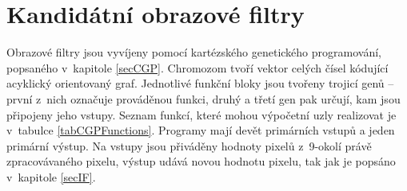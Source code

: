 \section{Kandidátní obrazové filtry}
\label{secDesignIF}

Obrazové filtry jsou vyvíjeny pomocí kartézského genetického programování, popsaného v~kapitole \ref{secCGP}. Chromozom tvoří vektor celých čísel kódující acyklický orientovaný graf. Jednotlivé funkční bloky jsou tvořeny trojicí genů -- první z~nich označuje prováděnou funkci, druhý a třetí gen pak určují, kam jsou připojeny jeho vstupy. Seznam funkcí, které mohou výpočetní uzly realizovat je v~tabulce \ref{tabCGPFunctions}. Programy mají devět primárních vstupů a jeden primární výstup. Na vstupy jsou přiváděny hodnoty pixelů z~9-okolí právě zpracovávaného pixelu, výstup udává novou hodnotu pixelu, tak jak je popsáno v~kapitole \ref{secIF}.

